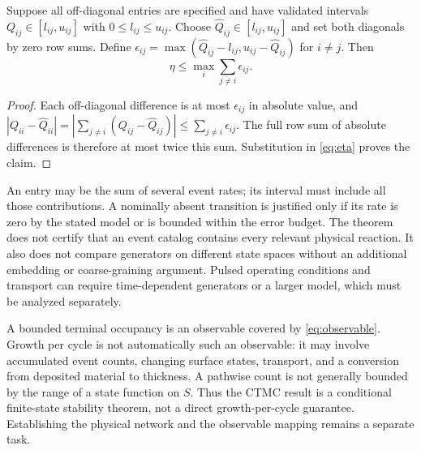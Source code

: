 \begin{corollary}
\label{cor:rates-generator}
Suppose all off-diagonal entries are specified and have validated intervals
$Q_{ij}\in[l_{ij},u_{ij}]$ with $0\le l_{ij}\le u_{ij}$.
Choose $\widehat Q_{ij}\in[l_{ij},u_{ij}]$ and set both diagonals by
zero row sums. Define
$\epsilon_{ij}=\max(\widehat Q_{ij}-l_{ij},u_{ij}-\widehat Q_{ij})$
for $i\ne j$. Then
\begin{equation}
 \eta\le\max_i\sum_{j\ne i}\epsilon_{ij}.
 \label{eq:rate-generator}
\end{equation}
\end{corollary}
\begin{proof}
Each off-diagonal difference is at most $\epsilon_{ij}$ in absolute
value, and
$|Q_{ii}-\widehat Q_{ii}|=
|\sum_{j\ne i}(Q_{ij}-\widehat Q_{ij})|
\le\sum_{j\ne i}\epsilon_{ij}$.
The full row sum of absolute differences is therefore at most twice this
sum. Substitution in \eqref{eq:eta} proves the claim.
\end{proof}

An entry may be the sum of several event rates; its interval must include
all those contributions. A nominally absent transition is justified only if
its rate is zero by the stated model or is bounded within the error budget.
The theorem does not certify that an event catalog contains every relevant
physical reaction. It also does not compare generators on different state
spaces without an additional embedding or coarse-graining argument. Pulsed
operating conditions and transport can require time-dependent generators or
a larger model, which must be analyzed separately.

A bounded terminal occupancy is an observable covered by
\eqref{eq:observable}. Growth per cycle is not automatically such an
observable: it may involve accumulated event counts, changing surface states,
transport, and a conversion from deposited material to thickness. A pathwise
count is not generally bounded by the range of a state function on $S$.
Thus the CTMC result is a conditional finite-state stability theorem, not a
direct growth-per-cycle guarantee. Establishing the physical network and the
observable mapping remains a separate task.
